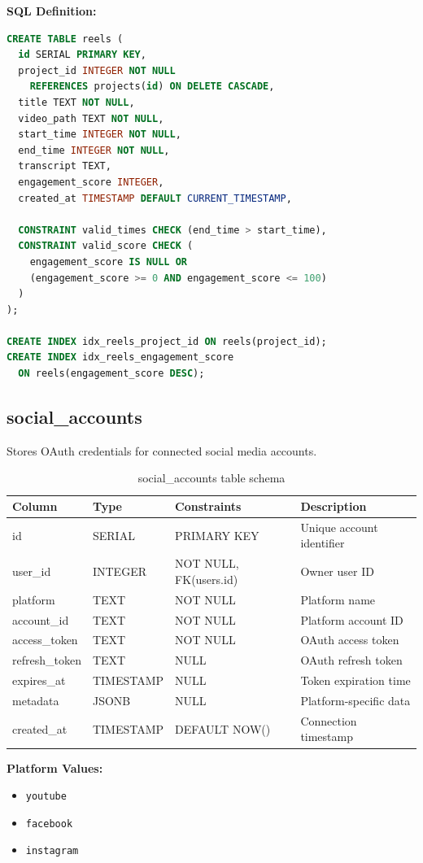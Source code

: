 \textbf{SQL Definition:}
\begin{lstlisting}[language=SQL]
CREATE TABLE reels (
  id SERIAL PRIMARY KEY,
  project_id INTEGER NOT NULL 
    REFERENCES projects(id) ON DELETE CASCADE,
  title TEXT NOT NULL,
  video_path TEXT NOT NULL,
  start_time INTEGER NOT NULL,
  end_time INTEGER NOT NULL,
  transcript TEXT,
  engagement_score INTEGER,
  created_at TIMESTAMP DEFAULT CURRENT_TIMESTAMP,
  
  CONSTRAINT valid_times CHECK (end_time > start_time),
  CONSTRAINT valid_score CHECK (
    engagement_score IS NULL OR 
    (engagement_score >= 0 AND engagement_score <= 100)
  )
);

CREATE INDEX idx_reels_project_id ON reels(project_id);
CREATE INDEX idx_reels_engagement_score 
  ON reels(engagement_score DESC);
\end{lstlisting}

\subsection{social\_accounts}

Stores OAuth credentials for connected social media accounts.

\begin{table}[h]
\centering
\begin{tabular}{|l|l|l|p{4cm}|}
\hline
\textbf{Column} & \textbf{Type} & \textbf{Constraints} & \textbf{Description} \\
\hline
id & SERIAL & PRIMARY KEY & Unique account identifier \\
user\_id & INTEGER & NOT NULL, FK(users.id) & Owner user ID \\
platform & TEXT & NOT NULL & Platform name \\
account\_id & TEXT & NOT NULL & Platform account ID \\
access\_token & TEXT & NOT NULL & OAuth access token \\
refresh\_token & TEXT & NULL & OAuth refresh token \\
expires\_at & TIMESTAMP & NULL & Token expiration time \\
metadata & JSONB & NULL & Platform-specific data \\
created\_at & TIMESTAMP & DEFAULT NOW() & Connection timestamp \\
\hline
\end{tabular}
\caption{social\_accounts table schema}
\end{table}

\textbf{Platform Values:}
\begin{itemize}
    \item \texttt{youtube}
    \item \texttt{facebook}
    \item \texttt{instagram}
\end{itemize}

